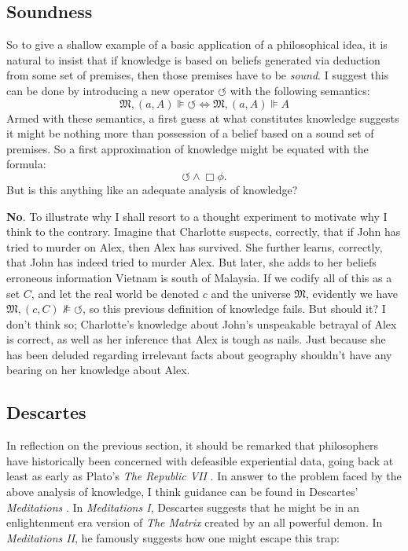\documentclass[11pt]{article}
\newcommand{\tmtextit}[1]{{\itshape{#1}}}
\numberwithin{equation}{subsection}
\renewcommand{\Omega}{\mathfrak{M}}
\begin{document}
\subsection{Soundness}\label{soundness}
So to give a shallow example of a basic application of a philosophical idea, it is natural to insist that if knowledge is based on beliefs generated via deduction from some set of premises, then those premises have to be \emph{sound}. I suggest this can be done by introducing a new operator $\circlearrowleft$ with the following semantics:
\[ \Omega,(a,A)\VDash \circlearrowleft \iff \Omega,(a,A)\VDash A\]
Armed with these semantics, a first guess at what constitutes knowledge suggests it might be nothing more than possession of a belief based on a sound set of premises. So a first approximation of knowledge might be equated with the formula:
$$\circlearrowleft \wedge \Box \phi.$$
But is this anything like an adequate analysis of knowledge?

\textbf{No}. To illustrate why I shall resort to a thought experiment to motivate why I think to the contrary.
Imagine that Charlotte suspects, correctly, that if John has tried to murder
on Alex, then Alex has survived.  She further learns, correctly, that John
has indeed tried to murder Alex.  But later, she adds to her beliefs erroneous
information Vietnam is south of Malaysia.  If we codify all of this as a set $C$, and let the real world be
denoted $c$ and the universe $\Omega$, evidently we have $\Omega, (c, C) \nVDash
\circlearrowleft$, so this previous definition of knowledge fails.  But
should it?  I don't think so; Charlotte's knowledge about John's unspeakable
betrayal of Alex is correct, as well as her inference that Alex is tough as
nails.  Just because she has been deluded regarding irrelevant facts about geography shouldn't have any bearing on her
knowledge about Alex.

\subsection{Descartes}\label{Descartes}

In reflection on the previous section, it should be remarked that philosophers have historically been concerned with defeasible experiential data, going back at least as early as Plato's \emph{The Republic VII} \citep{jowett_republic_1998}.
In answer to the problem faced by the above analysis of knowledge, I think guidance can be found in Descartes' \emph{Meditations} \citep{vietch_descartes_2005}.  In
\tmtextit{Meditations I}, Descartes suggests that he might be in an enlightenment era
version of \tmtextit{The Matrix} created by an all powerful demon.  In
\tmtextit{Meditations II}, he famously suggests how one might escape this
trap:
\end{document}
